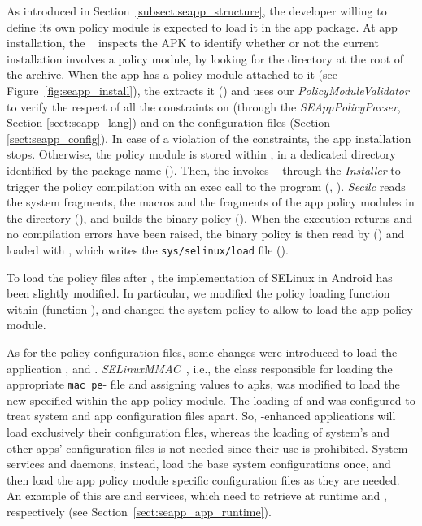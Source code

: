 As introduced in Section~\ref{subsect:seapp_structure}, the developer
willing to define its own policy module is expected to load it in the
app package.  At app installation, the \pms~\cite{seapp_pmsserva}
inspects the APK to identify whether or not the current installation
involves a policy module, by looking for the \apkpolicydir directory
at the root of the archive.  When the app has a policy module attached
to it (see Figure~\ref{fig:seapp_install}), the \pms extracts it
() and uses our \textit{PolicyModuleValidator} to
verify the respect of all the constraints on \sepolicy (through the
{\em SEAppPolicyParser}, Section \ref{sect:seapp_lang}) and on the
configuration files (Section \ref{sect:seapp_config}).  In case of a
violation of the constraints, the app installation stops.  Otherwise,
the policy module is stored within \dataselinux, in a dedicated
directory identified by the package name ().  Then, the
\pms invokes \installd~\cite{seapp_installdid} through the {\em
  Installer} to trigger the policy compilation with an exec call to
the \secilc program (, ).  {\em Secilc}
reads the system \sepolicy fragments, the \pap macros and the
\sepolicy fragments of the app policy modules in the \dataselinux
directory (), and builds the binary policy
().  When the \secilc execution returns and no
compilation errors have been raised, the binary policy is then read by
\installd () and loaded with \loadpolicy, which writes
the \texttt{sys/selinux/load} file ().

To load the policy files after \init, the implementation of SELinux in
Android has been slightly modified.  In particular, we modified the
policy loading function within \libselinux (function \loadpolicy), and
changed the system policy to allow \installd to load the app policy
module.

As for the policy configuration files, some changes were introduced to
load the application \filecontexts, \seappcontexts and
\macpermissions.  {\em SELinuxMMAC}~\cite{seapp_mmacsel}, i.e., the
class responsible for loading the appropriate {\tt mac\textunderscore
  pe}-  file and assigning \seinfo values
to apks, was modified to load the new \macpermissions specified within
the app policy module.  The loading of \filecontexts and
\seappcontexts was configured to treat system and app configuration
files apart.  So, \pap-enhanced applications will load exclusively
their configuration files, whereas the loading of system's and other
apps' configuration files is not needed since their use is prohibited.
System services and daemons, instead, load the base system
configurations once, and then load the app policy module specific
configuration files as they are needed.  An example of this are
\zygote and \restorecon services, which need to retrieve at runtime
\seappcontexts and \filecontexts, respectively (see
Section~\ref{sect:seapp_app_runtime}).

